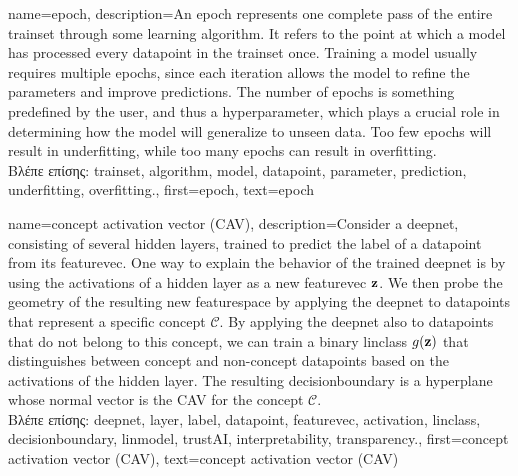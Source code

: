 {name={epoch},
	description={An epoch represents one complete pass of the entire \gls{trainset} through some learning 
		\gls{algorithm}. It refers to the point at which a \gls{model} has processed every \gls{datapoint} in the \gls{trainset} once. 
		Training a \gls{model} usually requires multiple epochs, since each iteration allows the \gls{model} to refine the 
		\gls{parameter}s and improve \gls{prediction}s. The number of epochs is something predefined by the user,  
		and thus a hyperparameter, which plays a crucial role in determining how the \gls{model} will generalize to unseen \gls{data}. 
		Too few epochs will result in \gls{underfitting}, while too many epochs can result in \gls{overfitting}. \\
		\foreignlanguage{greek}{Βλέπε επίσης:} \gls{trainset}, \gls{algorithm}, \gls{model}, \gls{datapoint}, \gls{parameter}, 
		\gls{prediction}, \gls{underfitting}, \gls{overfitting}.},
	first={epoch},
	text={epoch}
}

{name={concept activation vector (CAV)},
	description={Consider a \gls{deepnet}, consisting  of several hidden \gls{layer}s, 
		trained to predict the \gls{label} of a \gls{datapoint} from its \gls{featurevec}. One way 
		to explain the behavior of the trained \gls{deepnet} is by using the \gls{activation}s of a 
		hidden \gls{layer} as a new \gls{featurevec} ${\bf z}$. We then probe the geometry of the 
		resulting new \gls{featurespace} by applying the \gls{deepnet} to \gls{datapoint}s 
		that represent a specific concept $\mathcal{C}$. By applying the \gls{deepnet} also to \gls{datapoint}s 
		that do not belong to this concept, we can train a binary \gls{linclass} $g({\bf z})$ that distinguishes 
		between concept and non-concept \gls{datapoint}s based on the \gls{activation}s of the hidden \gls{layer}. The resulting 
		\gls{decisionboundary} is a hyperplane whose normal \gls{vector} is the CAV for the concept $\mathcal{C}$. \\
		\foreignlanguage{greek}{Βλέπε επίσης:} \gls{deepnet}, \gls{layer}, \gls{label}, \gls{datapoint}, \gls{featurevec}, \gls{activation}, 
		\gls{linclass}, \gls{decisionboundary}, \gls{linmodel}, \gls{trustAI}, \gls{interpretability}, \gls{transparency}.}, 
	first={concept activation vector (CAV)},
	text={concept activation vector (CAV)}
}

